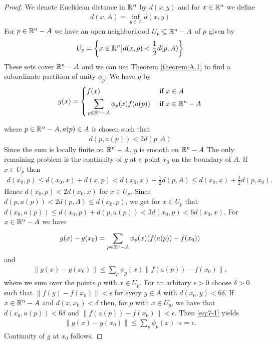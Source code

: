\begin{proof}
  We denote Euclidean distance in $\mathbb{R}^n$ by $d(x, y)$ and for $x\in\mathbb{R}^n$ we define 
  \begin{align*}
    d(x, A) = \inf_{y\in A} d(x, y)
  \end{align*}
  For $p\in\mathbb{R}^n-A$ we have an open neighborhood $U_p\subseteq\mathbb{R}^n-A$ of $p$ given by 
  \begin{align*}
    U_p = \left\{x\in\mathbb{R}^n\big| d(x, p)< \frac12d(p, A)\right\}
  \end{align*}
  These sets cover $\mathbb{R}^n-A$ and we can use Theorem \ref{theorem:A.1} to find a subordinate
  partition of unity $\phi_p$. We have $g$ by 
  \begin{align*}
    g(x) = \left\{\begin{aligned}
      & f(x) && \text{ if } x\in A \\
      & \sum_{p\in\mathbb{R}^n-A}\phi_p(x)f(a(p)) && \text{ if } x\in\mathbb{R}^n-A
    \end{aligned}\right.
  \end{align*}

  where $p\in\mathbb{R}^n - A, a(p)\in A$ is chosen such that 
  \begin{align*}
    d(p, a(p))< 2d(p, A)
  \end{align*}
  Since the sum is locally finite on $\mathbb{R}^n-A$, $g$ is smooth on $\mathbb{R}^n-A$
  The only remaining problem is the continuity of $g$ at a point $x_0$ on the boundary
  of $A$. If$ x\in U_p$ then
  \begin{align*}
    d(x_0, p) 
      \le d(x_0, x) + d(x, p)
      < d(x_0, x) + \frac12d(p, A)
      \le d(x_0, x) + \frac12d(p, x_0).
  \end{align*}
  Hence $d(x_0, p)<2d(x_0, x)$ for $x\in U_p$. Since $d(p, a(p))<2d(p, A)\le d(x_0, p)$, we get 
  for $x\in U_p$ that $d(x_0, a(p))\le d(x_0, p) + d(p, a(p))<3d(x_0, p)<6d(x_0, x)$. For $x\in\mathbb{R}^n-A$
  we have 
  \begin{align*}
    g(x) - g(x_0)
    = \sum_{p\in\mathbb{R}^n-A}^{}{\phi_p(x)(f(a(p)) - f(x_0))}
  \end{align*}
  and 
  \begin{align}\label{eq:7-1}
    \|g(x)-g(x_0)\| \le \sum_{p}^{}{\phi_p(x) \|f(a(p)) - f(x_0)\|},
  \end{align}
  where we sum over the points $p$ with $x\in U_p$. 
  For an arbitary $\epsilon>0$ choose $\delta >0$ such that $\|f(y)-f(x_0)\|<\epsilon$ for every 
  $y\in A$ with $d(x_0, y)<6\delta$. If $x\in\mathbb{R}^n-A$ and $d(x, x_0)<\delta$ then, for $p$ with 
  $x\in U_p$, we have that $d(x_0, a(p))<6\delta$ and $\|f(a(p)) - f(x_0)\|<\epsilon$. Then 
  \eqref{eq:7-1} yields
  \begin{align*}
    \|g(x) - g(x_0)\| \le \sum_{p}^{}{\phi_p(x)\cdot\epsilon} = \epsilon.
  \end{align*}
  Continuity of $g$ at $x_0$ follows.
\end{proof}

